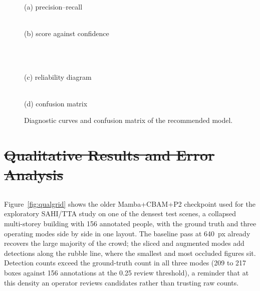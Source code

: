\documentclass[12pt,a4paper,oneside]{report}
\providecommand{\DIFadd}[1]{{\protect\color{blue}\uwave{#1}}} %
\providecommand{\DIFdel}[1]{{\protect\color{red}\sout{#1}}}                      %
\providecommand{\DIFaddbegin}{} %
\providecommand{\DIFaddend}{} %
\providecommand{\DIFdelbegin}{} %
\providecommand{\DIFdelend}{} %
\begin{document}
\begin{figure}[tbp]
  \centering
  \begin{minipage}[t]{0.49\linewidth}\centering
    \\[2pt]
    {\small (a) precision--recall}
  \end{minipage}\hfill
  \begin{minipage}[t]{0.49\linewidth}\centering
    \\[2pt]
    {\small (b) score against confidence}
  \end{minipage}\\[6pt]
  \begin{minipage}[t]{0.49\linewidth}\centering
    \\[2pt]
    {\small (c) reliability diagram}
  \end{minipage}\hfill
  \begin{minipage}[t]{0.49\linewidth}\centering
    \\[2pt]
    {\small (d) confusion matrix}
  \end{minipage}
  \caption{Diagnostic curves and confusion matrix of the recommended model.}
  \label{fig:diag}
\end{figure}

\DIFdelbegin \section{\DIFdel{Qualitative Results and Error Analysis}}
\addtocounter{section}{-1}%
\DIFdelend \DIFaddbegin \subsection{\DIFadd{Qualitative Results}}
\DIFaddend \label{sec:qual}
Figure~\ref{fig:qualgrid} shows the older Mamba+CBAM+P2 checkpoint used for the
exploratory SAHI/TTA study on one of the densest test scenes, a collapsed
multi-storey building with 156 annotated people, with the ground truth and
three operating modes side by side in one layout.
The baseline pass at 640~px already recovers the large majority of the crowd;
the sliced and augmented modes add detections along the rubble line, where
the smallest and most occluded figures sit. Detection counts exceed the
ground-truth count in all three modes (209 to 217 boxes against 156
annotations at the 0.25 review threshold), a reminder that at this density an
operator reviews candidates rather than trusting raw counts.
\end{document}
